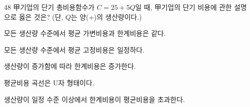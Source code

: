 \begin{question}{48}
甲기업의 단기 총비용함수가 $C = 25 + 5Q$일 때, 甲기업의 단기 비용에 관한 설명으로 옳은 것은? (단, $Q$는 양(+)의 생산량이다.)
\begin{choices}
  \item 모든 생산량 수준에서 평균 가변비용과 한계비용은 같다.
  \item 모든 생산량 수준에서 평균 고정비용은 일정하다.
  \item 생산량이 증가함에 따라 한계비용은 증가한다.
  \item 평균비용 곡선은 U자 형태이다.
  \item 생산량이 일정 수준 이상에서 한계비용이 평균비용을 초과한다.
\end{choices}
\end{question}
